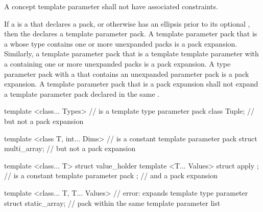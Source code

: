 \pnum
A concept template parameter shall not have
associated constraints.

\pnum
If a  is
a  that declares a pack, or
otherwise has an ellipsis prior to its optional ,
then the 
declares a template parameter pack.
A template parameter pack that is a  whose type
contains one or more unexpanded packs is a pack expansion. Similarly,
a template parameter pack that is a template template parameter with a
 containing one or more unexpanded
packs is a pack expansion.
A type parameter pack with a  that
contains an unexpanded parameter pack is a pack expansion.
A template parameter pack that is a pack
expansion shall not expand a template parameter pack declared in the same
.
\begin{example}
\begin{codeblock}
template <class... Types>                       //  is a template type parameter pack
   class Tuple;                                 // but not a pack expansion

template <class T, int... Dims>                 //  is a constant template parameter pack
   struct multi_array;                          // but not a pack expansion

template <class... T>
  struct value_holder {
    template <T... Values> struct apply { };    //  is a constant template parameter pack
  };                                            // and a pack expansion

template <class... T, T... Values>              // error:  expands template type parameter
  struct static_array;                          // pack  within the same template parameter list
\end{codeblock}
\end{example}

